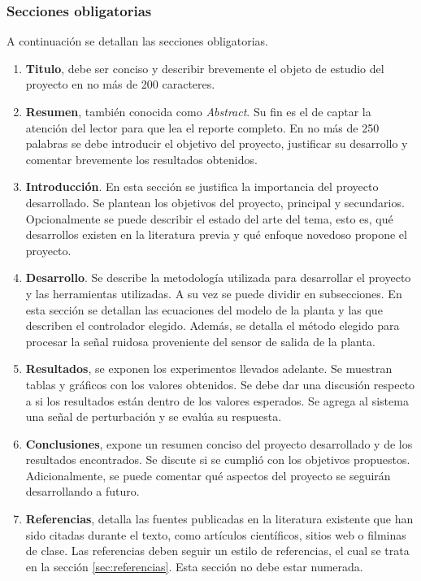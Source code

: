 \documentclass{article}
\begin{document}
\subsubsection{Secciones obligatorias}

A continuación se detallan las secciones obligatorias.

\begin{enumerate}

    \item \textbf{Titulo}, debe ser conciso y describir brevemente el objeto de estudio del proyecto en no más de 200 caracteres.

    \item \textbf{Resumen}, también conocida como \textit{Abstract}. Su fin es el de captar la atención del lector para que lea el reporte completo. En no más de 250 palabras se debe introducir el objetivo del proyecto, justificar su desarrollo y comentar brevemente los resultados obtenidos.

    \item \textbf{Introducción}. En esta sección se justifica la importancia del proyecto desarrollado. Se plantean los objetivos del proyecto, principal y secundarios. Opcionalmente se puede describir el estado del arte del tema, esto es, qué desarrollos existen en la literatura previa y qué enfoque novedoso propone el proyecto.

    \item \textbf{Desarrollo}. Se describe la metodología utilizada para desarrollar el proyecto y las herramientas utilizadas. A su vez se puede dividir en subsecciones. En esta sección se detallan las ecuaciones del modelo de la planta y las que describen el controlador elegido. Además, se detalla el método elegido para procesar la señal ruidosa proveniente del sensor de salida de la planta.

    \item \textbf{Resultados}, se exponen los experimentos llevados adelante. Se muestran tablas y gráficos con los valores obtenidos. Se debe dar una discusión respecto a si los resultados están dentro de los valores esperados. Se agrega al sistema una señal de perturbación y se evalúa su respuesta.

    \item \textbf{Conclusiones}, expone un resumen conciso del proyecto desarrollado y de los resultados encontrados. Se discute si se cumplió con los objetivos propuestos. Adicionalmente, se puede comentar qué aspectos del proyecto se seguirán desarrollando a futuro.

    \item \textbf{Referencias}, detalla las fuentes publicadas en la literatura existente que han sido citadas durante el texto, como artículos científicos, sitios web o filminas de clase. Las referencias deben seguir un estilo de referencias, el cual se trata en la sección \ref{sec:referencias}. Esta sección no debe estar numerada.

\end{enumerate}
\end{document}
